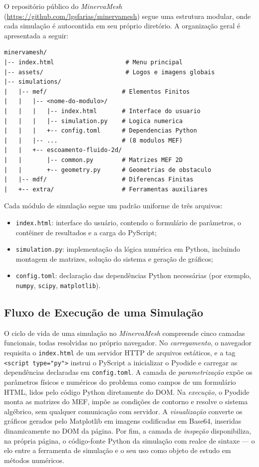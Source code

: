 O repositório público do \textit{MinervaMesh} (\url{https://github.com/lgsfarias/minervamesh}) segue uma estrutura modular, onde cada simulação é autocontida em seu próprio diretório. A organização geral é apresentada a seguir:

\begin{lstlisting}[style=dirstyle,numbers=none]
minervamesh/
|-- index.html                    # Menu principal
|-- assets/                       # Logos e imagens globais
|-- simulations/
|   |-- mef/                     # Elementos Finitos
|   |   |-- <nome-do-modulo>/
|   |   |   |-- index.html       # Interface do usuario
|   |   |   |-- simulation.py    # Logica numerica
|   |   |   +-- config.toml      # Dependencias Python
|   |   |-- ...                  # (8 modulos MEF)
|   |   +-- escoamento-fluido-2d/
|   |       |-- common.py        # Matrizes MEF 2D
|   |       +-- geometry.py      # Geometrias de obstaculo
|   |-- mdf/                     # Diferencas Finitas
|   +-- extra/                   # Ferramentas auxiliares
\end{lstlisting}

Cada módulo de simulação segue um padrão uniforme de três arquivos:
\begin{itemize}
    \item \texttt{index.html}: interface do usuário, contendo o formulário de parâmetros, o contêiner de resultados e a carga do PyScript;
    \item \texttt{simulation.py}: implementação da lógica numérica em Python, incluindo montagem de matrizes, solução do sistema e geração de gráficos;
    \item \texttt{config.toml}: declaração das dependências Python necessárias (por exemplo, \texttt{numpy}, \texttt{scipy}, \texttt{matplotlib}).
\end{itemize}

\subsection{Fluxo de Execução de uma Simulação}
\label{sec:fluxo_execucao}

O ciclo de vida de uma simulação no \textit{MinervaMesh} compreende cinco camadas funcionais, todas resolvidas no próprio navegador. No \emph{carregamento}, o navegador requisita o \texttt{index.html} de um servidor HTTP de arquivos estáticos, e a tag \texttt{<script type="py">} instrui o PyScript a inicializar o Pyodide e carregar as dependências declaradas em \texttt{config.toml}. A camada de \emph{parametrização} expõe os parâmetros físicos e numéricos do problema como campos de um formulário HTML, lidos pelo código Python diretamente do DOM. Na \emph{execução}, o Pyodide monta as matrizes do MEF, impõe as condições de contorno e resolve o sistema algébrico, sem qualquer comunicação com servidor. A \emph{visualização} converte os gráficos gerados pelo Matplotlib em imagens codificadas em Base64, inseridas dinamicamente no DOM da página. Por fim, a camada de \emph{inspeção} disponibiliza, na própria página, o código-fonte Python da simulação com realce de sintaxe --- o elo entre a ferramenta de simulação e o seu uso como objeto de estudo em métodos numéricos.

